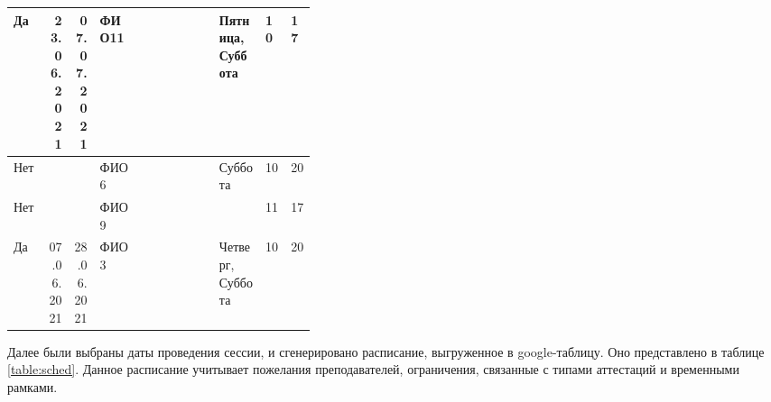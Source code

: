 \begin{table}[htbp]
\begin{tabular}{|p{0.05\linewidth}|p{0.02\linewidth}|p{0.02\linewidth}|p{0.07\linewidth}|p{0.07\linewidth}|p{0.02\linewidth}|p{0.02\linewidth}|p{0.08\linewidth}|p{0.02\linewidth}|p{0.02\linewidth}|}
		Да           & \multicolumn{1}{r|}{23.06.2021} & \multicolumn{1}{r|}{07.07.2021} & ФИО11 &                           &                                 &                                 & Пятница, Суббота & 10                        & 17                        \\ \hline
		Нет          &                                 &                                 & ФИО6  &                           &                                 &                                 & Суббота                       & 10                        & 20                        \\ \hline
		Нет          &                                 &                                 & ФИО9  &                           &                                 &                                 &                               & 11                        & 17                        \\ \hline
		Да           & \multicolumn{1}{r|}{07.06.2021} & \multicolumn{1}{r|}{28.06.2021} & ФИО3  &                           &                                 &                                 & Четверг, Суббота              & 10                        & 20                        \\ \hline
	\end{tabular} 	\label{table:wishes}
\end{table} 
\FloatBarrier

Далее были выбраны даты проведения сессии, и сгенерировано расписание, выгруженное в google-таблицу. Оно представлено в таблице \ref{table:sched}. Данное расписание учитывает пожелания преподавателей, ограничения, связанные с типами аттестаций и временными рамками.

